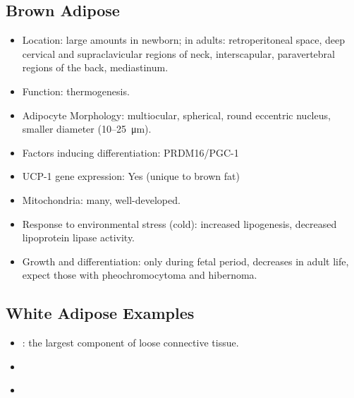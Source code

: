 \begin{itemize}
  \subsection{Brown Adipose}
  \begin{center}
  \end{center}
  \bigskip
  \begin{itemize}
    \item Location: large amounts in newborn; in adults: retroperitoneal space, deep cervical and supraclavicular regions of neck, interscapular, paravertebral regions of the back, mediastinum.
    \item Function: thermogenesis.
    \item Adipocyte Morphology: multiocular, spherical, round eccentric nucleus, smaller diameter (10--\SI{25}{\micro\meter}).
    \item Factors inducing differentiation: PRDM16/PGC-1
    \item UCP-1 gene expression: Yes (unique to brown fat)
    \item Mitochondria: many, well-developed.
    \item Response to environmental stress (cold): increased lipogenesis, decreased lipoprotein lipase activity.
    \item Growth and differentiation: only during fetal period, decreases in adult life, expect those with pheochromocytoma and hibernoma.
  \end{itemize}
  
  \newpage
  \subsection{White Adipose Examples}
  \begin{multicols}{2}
  \begin{itemize}
    \item {}: the largest component of loose connective tissue.
    
    \begin{center}
    \end{center}
    \item {}
    
    \begin{center}
    \end{center}
    \item {}
    

\end{itemize}
\end{multicols}
\end{itemize}
